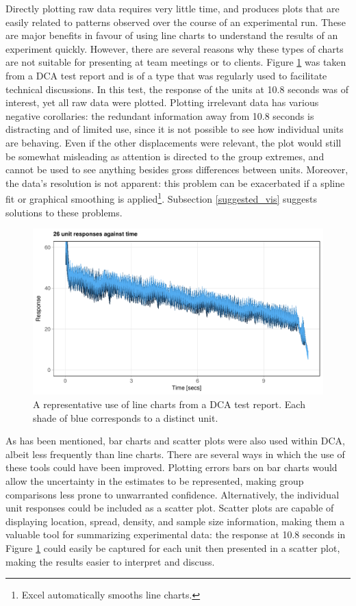 \documentclass[11pt,a4paper,article]{memoir} %
\begin{document}
Directly plotting raw data requires very little time, and produces plots that are easily related to patterns observed over the course of an experimental run. These are major benefits in favour of using line charts to understand the results of an experiment quickly. However, there are several reasons why these types of charts are not suitable for presenting at team meetings or to clients. Figure \ref{fig:line_chart} was taken from a DCA test report and is of a type that was regularly used to facilitate technical discussions. In this test, the response of the units at 10.8 seconds was of interest, yet all raw data were plotted. Plotting irrelevant data has various negative corollaries: the redundant information away from 10.8 seconds is distracting and of limited use, since it is not possible to see how individual units are behaving.  Even if the other displacements were relevant, the plot would still be somewhat misleading as attention is directed to the group extremes, and cannot be used to see anything besides gross differences between units. Moreover, the data's resolution is not apparent: this problem can be exacerbated if a spline fit or graphical smoothing is applied\footnote{Excel automatically smooths line charts.}. Subsection \ref{suggested_vis} suggests solutions to these problems.
\begin{figure}[h!]
\includegraphics[width=\textwidth]{imitation_line_chart_2.pdf}
\caption{A representative use of line charts from a DCA test report. Each shade of blue corresponds to a distinct unit.}
\label{fig:line_chart}
\end{figure}

As has been mentioned, bar charts and scatter plots were also used within DCA, albeit less frequently than line charts. There are several ways in which the use of these tools could have been improved. Plotting errors bars on bar charts would allow the uncertainty in the estimates to be represented, making group comparisons less prone to unwarranted confidence. Alternatively, the individual unit responses could be included as a scatter plot. Scatter plots are capable of displaying location, spread, density, and sample size information, making them a valuable tool for summarizing experimental data: the response at 10.8 seconds in Figure \ref{fig:line_chart} could easily be captured for each unit then presented in a scatter plot, making the results easier to interpret and discuss.
\end{document}

